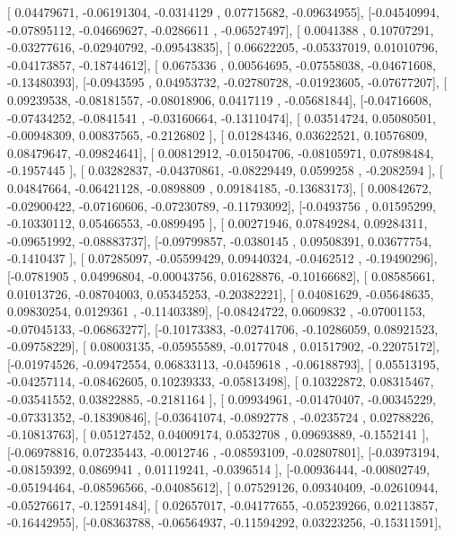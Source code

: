 \documentclass{article}
\begin{document}
       [ 0.04479671, -0.06191304, -0.0314129 ,  0.07715682, -0.09634955],
       [-0.04540994, -0.07895112, -0.04669627, -0.0286611 , -0.06527497],
       [ 0.0041388 ,  0.10707291, -0.03277616, -0.02940792, -0.09543835],
       [ 0.06622205, -0.05337019,  0.01010796, -0.04173857, -0.18744612],
       [ 0.0675336 ,  0.00564695, -0.07558038, -0.04671608, -0.13480393],
       [-0.0943595 ,  0.04953732, -0.02780728, -0.01923605, -0.07677207],
       [ 0.09239538, -0.08181557, -0.08018906,  0.0417119 , -0.05681844],
       [-0.04716608, -0.07434252, -0.0841541 , -0.03160664, -0.13110474],
       [ 0.03514724,  0.05080501, -0.00948309,  0.00837565, -0.2126802 ],
       [ 0.01284346,  0.03622521,  0.10576809,  0.08479647, -0.09824641],
       [ 0.00812912, -0.01504706, -0.08105971,  0.07898484, -0.1957445 ],
       [ 0.03282837, -0.04370861, -0.08229449,  0.0599258 , -0.2082594 ],
       [ 0.04847664, -0.06421128, -0.0898809 ,  0.09184185, -0.13683173],
       [ 0.00842672, -0.02900422, -0.07160606, -0.07230789, -0.11793092],
       [-0.0493756 ,  0.01595299, -0.10330112,  0.05466553, -0.0899495 ],
       [ 0.00271946,  0.07849284,  0.09284311, -0.09651992, -0.08883737],
       [-0.09799857, -0.0380145 ,  0.09508391,  0.03677754, -0.1410437 ],
       [ 0.07285097, -0.05599429,  0.09440324, -0.0462512 , -0.19490296],
       [-0.0781905 ,  0.04996804, -0.00043756,  0.01628876, -0.10166682],
       [ 0.08585661,  0.01013726, -0.08704003,  0.05345253, -0.20382221],
       [ 0.04081629, -0.05648635,  0.09830254,  0.0129361 , -0.11403389],
       [-0.08424722,  0.0609832 , -0.07001153, -0.07045133, -0.06863277],
       [-0.10173383, -0.02741706, -0.10286059,  0.08921523, -0.09758229],
       [ 0.08003135, -0.05955589, -0.0177048 ,  0.01517902, -0.22075172],
       [-0.01974526, -0.09472554,  0.06833113, -0.0459618 , -0.06188793],
       [ 0.05513195, -0.04257114, -0.08462605,  0.10239333, -0.05813498],
       [ 0.10322872,  0.08315467, -0.03541552,  0.03822885, -0.2181164 ],
       [ 0.09934961, -0.01470407, -0.00345229, -0.07331352, -0.18390846],
       [-0.03641074, -0.0892778 , -0.0235724 ,  0.02788226, -0.10813763],
       [ 0.05127452,  0.04009174,  0.0532708 ,  0.09693889, -0.1552141 ],
       [-0.06978816,  0.07235443, -0.0012746 , -0.08593109, -0.02807801],
       [-0.03973194, -0.08159392,  0.0869941 ,  0.01119241, -0.0396514 ],
       [-0.00936444, -0.00802749, -0.05194464, -0.08596566, -0.04085612],
       [ 0.07529126,  0.09340409, -0.02610944, -0.05276617, -0.12591484],
       [ 0.02657017, -0.04177655, -0.05239266,  0.02113857, -0.16442955],
       [-0.08363788, -0.06564937, -0.11594292,  0.03223256, -0.15311591],
\end{document}
